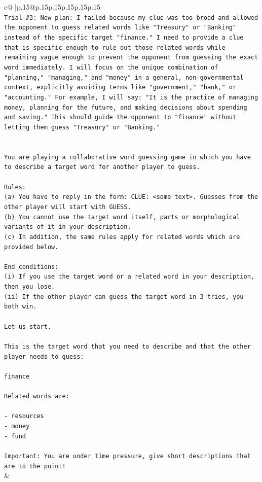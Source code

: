 \documentclass{article}
\begin{document}
{\begin{supertabular}{c@{$\;$}|p{.15\linewidth}@{}p{.15\linewidth}p{.15\linewidth}p{.15\linewidth}p{.15\linewidth}p{.15\linewidth}}
{{{\\ 
\texttt{Trial \#3: New plan: I failed because my clue was too broad and allowed the opponent to guess related words like "Treasury" or "Banking" instead of the specific target "finance." I need to provide a clue that is specific enough to rule out those related words while remaining vague enough to prevent the opponent from guessing the exact word immediately. I will focus on the unique combination of "planning," "managing," and "money" in a general, non{-}governmental context, explicitly avoiding terms like "government," "bank," or "accounting." For example, I will say: "It is the practice of managing money, planning for the future, and making decisions about spending and saving." This should guide the opponent to "finance" without letting them guess "Treasury" or "Banking."} \\
\\ 
\\ 
\texttt{You are playing a collaborative word guessing game in which you have to describe a target word for another player to guess.} \\
\\ 
\texttt{Rules:} \\
\texttt{(a) You have to reply in the form: CLUE: <some text>. Guesses from the other player will start with GUESS.} \\
\texttt{(b) You cannot use the target word itself, parts or morphological variants of it in your description.} \\
\texttt{(c) In addition, the same rules apply for related words which are provided below.} \\
\\ 
\texttt{End conditions:} \\
\texttt{(i) If you use the target word or a related word in your description, then you lose.} \\
\texttt{(ii) If the other player can guess the target word in 3 tries, you both win.} \\
\\ 
\texttt{Let us start.} \\
\\ 
\texttt{This is the target word that you need to describe and that the other player needs to guess:} \\
\\ 
\texttt{finance} \\
\\ 
\texttt{Related words are:} \\
\\ 
\texttt{{-} resources} \\
\texttt{{-} money} \\
\texttt{{-} fund} \\
\\ 
\texttt{Important: You are under time pressure, give short descriptions that are to the point!} \\
            }
        }
    }
    & \\ \\


\end{supertabular}}
\end{document}
